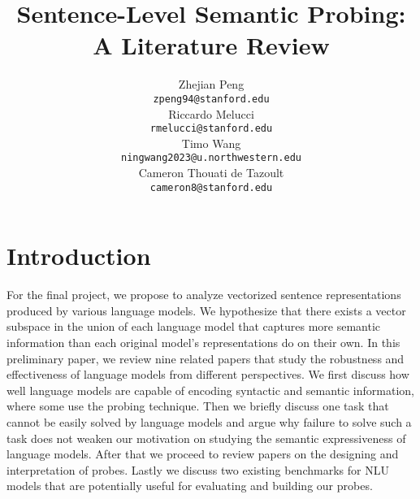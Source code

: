 \documentclass[11pt,a4paper]{article}
\title{Sentence-Level Semantic Probing: A Literature Review}
\author{Zhejian Peng \\
  \texttt{zpeng94@stanford.edu} \\\And
  Riccardo Melucci \\
  \texttt{rmelucci@stanford.edu} \\\And
  Timo Wang \\
  \texttt{ningwang2023@u.northwestern.edu} \\
  Cameron Thouati de Tazoult \\
  \texttt{cameron8@stanford.edu}
  }
\date{}
\begin{document}
\maketitle


\section{Introduction}
For the final project, we propose to analyze vectorized sentence representations produced by various language models.
We hypothesize that there exists a vector subspace in the union of each language model that captures more semantic information than each original model's representations do on their own. 
In this preliminary paper, we review nine related papers that study the robustness and effectiveness of language models from different perspectives. 
We first discuss how well language models are capable of encoding syntactic and semantic information, where some use the probing technique. 
Then we briefly discuss one task that cannot be easily solved by language models and argue why failure to solve such a task does not weaken our motivation on studying the semantic expressiveness of language models.
After that we proceed to review papers on the designing and interpretation of probes.
Lastly we discuss two existing benchmarks for NLU models that are potentially useful for evaluating and building our probes.

\end{document}
